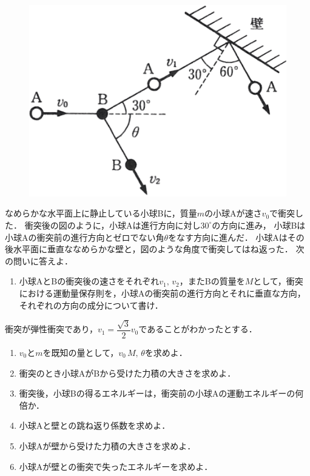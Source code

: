 {
\begin{figure}
  \vspace*{-\intextsep}
  \includegraphics[width=12zw]{../graphs/se_1H_106.png}
\end{figure}
なめらかな水平面上に静止している小球Bに，質量$m$の小球Aが速さ$v_0$で衝突した．
衝突後の図のように，小球Aは進行方向に対し$30^\circ$の方向に進み，
小球Bは小球Aの衝突前の進行方向とゼロでない角$\theta$をなす方向に進んだ．
小球Aはその後水平面に垂直ななめらかな壁と，図のような角度で衝突してはね返った．
次の問いに答えよ．
\par}

\begin{enumerate}[（1）]
  \setlength{\leftskip}{-1.5zw}
  \setlength{\itemindent}{1zw}\setlength{\labelsep}{0.5zw}
  \setlength{\labelwidth}{1zw}\setlength{\leftmargin}{1zw}
  \item 小球AとBの衝突後の速さをそれぞれ$v_1,\,v_2$，またBの質量を$M$として，衝突における運動量保存則を，小球Aの衝突前の進行方向とそれに垂直な方向，それぞれの方向の成分について書け．
\end{enumerate}

衝突が弾性衝突であり，$v_1 = \dfrac{\sqrt{3}}{2}v_0$であることがわかったとする．
\begin{enumerate}[（1）]
  \setlength{\leftskip}{-1.5zw}
  \setlength{\itemindent}{1zw}\setlength{\labelsep}{0.5zw}
  \setlength{\labelwidth}{1zw}\setlength{\leftmargin}{1zw}
  \setcounter{enumi}{1}
  \item $v_0$と$m$を既知の量として，$v_0\,M,\,\theta$を求めよ．
  \item 衝突のとき小球AがBから受けた力積の大きさを求めよ．
  \item 衝突後，小球Bの得るエネルギーは，衝突前の小球Aの運動エネルギーの何倍か．
  \item 小球Aと壁との跳ね返り係数を求めよ．
  \item 小球Aが壁から受けた力積の大きさを求めよ．
  \item 小球Aが壁との衝突で失ったエネルギーを求めよ．
\end{enumerate}

